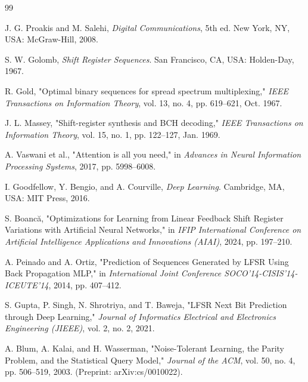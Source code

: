 \documentclass[12pt,a4paper]{report}
\theoremstyle{plain}
\begin{document}
\clearpage
\renewcommand{\bibname}{BIBLIOGRAPHY} %
\begin{thebibliography}{99}

J. G. Proakis and M. Salehi, \textit{Digital Communications}, 5th ed. New York, NY, USA: McGraw-Hill, 2008.

S. W. Golomb, \textit{Shift Register Sequences}. San Francisco, CA, USA: Holden-Day, 1967.

R. Gold, "Optimal binary sequences for spread spectrum multiplexing," \textit{IEEE Transactions on Information Theory}, vol. 13, no. 4, pp. 619–621, Oct. 1967.

J. L. Massey, "Shift-register synthesis and BCH decoding," \textit{IEEE Transactions on Information Theory}, vol. 15, no. 1, pp. 122–127, Jan. 1969.

A. Vaswani et al., "Attention is all you need," in \textit{Advances in Neural Information Processing Systems}, 2017, pp. 5998–6008.

I. Goodfellow, Y. Bengio, and A. Courville, \textit{Deep Learning}. Cambridge, MA, USA: MIT Press, 2016.

S. Boancă, "Optimizations for Learning from Linear Feedback Shift Register Variations with Artificial Neural Networks," in \textit{IFIP International Conference on Artificial Intelligence Applications and Innovations (AIAI)}, 2024, pp. 197–210.

A. Peinado and A. Ortiz, "Prediction of Sequences Generated by LFSR Using Back Propagation MLP," in \textit{International Joint Conference SOCO’14-CISIS’14-ICEUTE’14}, 2014, pp. 407–412.

S. Gupta, P. Singh, N. Shrotriya, and T. Baweja, "LFSR Next Bit Prediction through Deep Learning," \textit{Journal of Informatics Electrical and Electronics Engineering (JIEEE)}, vol. 2, no. 2, 2021.

A. Blum, A. Kalai, and H. Wasserman, "Noise-Tolerant Learning, the Parity Problem, and the Statistical Query Model," \textit{Journal of the ACM}, vol. 50, no. 4, pp. 506–519, 2003. (Preprint: arXiv:cs/0010022).


\end{thebibliography}
\end{document}
